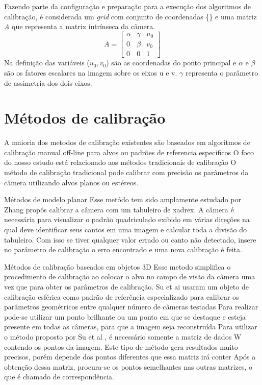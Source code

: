 \documentclass[portuguese]{sbrt}
\begin{document}
Fazendo parte da configuração e preparação para a execução dos algoritmos de calibração, é considerada um \textit{grid} com conjunto de coordenadas \{\} e uma matriz \textit{A} que representa a matrix intrínseca da câmera.
  $$
  A =
  \begin{bmatrix}
   \alpha & \gamma & u_{0}\\ 
   0      & \beta  & v_{0}\\
   0      & 0      & 1    
  \end{bmatrix}
  $$
\newline
  Na definição das variáveis ($u_{0}, v_{0}$) são as coordenadas do ponto principal e $\alpha$ e $\beta$ são os fatores escalares na imagem sobre os eixos u e v. $\gamma$ representa o parâmetro de assimetria dos dois eixos.
\section{Métodos de calibração}
\label{sec:metodos}

A maioria dos metodos de calibração existentes são baseados em algoritmos de
calibração manual off-line para alvos ou padrões de referencia especificos
O foco do nosso estudo está relacionado aos métodos tradicionais de calibração
O método de calibração tradicional pode calibrar com precisão os parâmetros da câmera
utilizando alvos planos ou estéreos. 

Métodos de modelo planar
Esse metódo tem sido amplamente estudado por Zhang \cite{Zhang:2000} propôs calibrar a câmera com um tabuleiro de xadrex.
A câmera é necessária para visualizar o padrão quadriculado exibido em várias direções
na qual deve identificar seus cantos em uma imagem e calcular toda a divisão do tabuleiro. 
Com isso se tiver qualquer valor errado ou canto não detectado, insere no parâmetro de calibração o erro encontrado e uma nova calibração é feita.

Métodos de calibração baseados em objetos 3D
Esse metodo simplifica o procedimento de calibração ao colocar o alvo no campo de visão da câmera uma vez que para obter os parâmetros de calibração.
Su et ai \cite{Svoboda:2005}usaram um objeto de calibração esférica como padrão de referência especializado para calibrar os parâmetros geométricos entre qualquer número de câmeras testadas 
Para realizar pode-se utilizar um ponto brilhante ou um ponto em que se destaque e esteja presente em todas as câmeras, para que a imagem seja reconstruída
Para utilizar o método proposto por Su et al \cite{Svoboda:2005}, é necessário somente a matriz de dados W contendo os pontos da imagem.
Este tipo de método gera resultados muito precisos, porém depende dos pontos diferentes que essa matriz irá conter
Após a obtenção dessa matriz, procura-se os pontos semelhantes nas outras matrizes, o que é chamado de correspondência.
\end{document}
